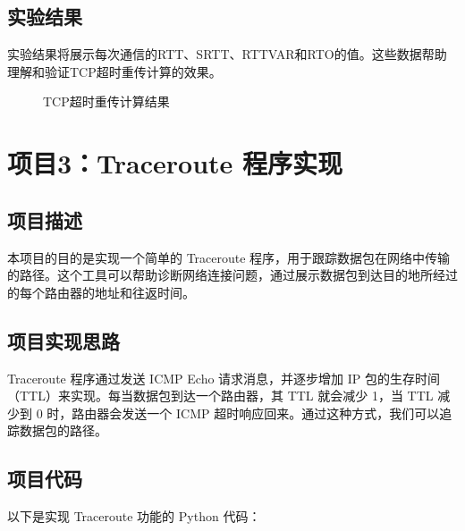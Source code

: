 \documentclass[UTF8,titlepage]{ctexart}
\numberwithin{figure}{section}
\begin{document}
\subsection{实验结果}
实验结果将展示每次通信的RTT、SRTT、RTTVAR和RTO的值。这些数据帮助理解和验证TCP超时重传计算的效果。
\begin{figure}[H]
\centering
 \caption{TCP超时重传计算结果}
 \label{}
\end{figure}
\clearpage
\section{项目3：Traceroute 程序实现}
\subsection{项目描述}
本项目的目的是实现一个简单的 Traceroute 程序，用于跟踪数据包在网络中传输的路径。这个工具可以帮助诊断网络连接问题，通过展示数据包到达目的地所经过的每个路由器的地址和往返时间。

\subsection{项目实现思路}
Traceroute 程序通过发送 ICMP Echo 请求消息，并逐步增加 IP 包的生存时间（TTL）来实现。每当数据包到达一个路由器，其 TTL 就会减少 1，当 TTL 减少到 0 时，路由器会发送一个 ICMP 超时响应回来。通过这种方式，我们可以追踪数据包的路径。

\subsection{项目代码}
以下是实现 Traceroute 功能的 Python 代码：
\end{document}
